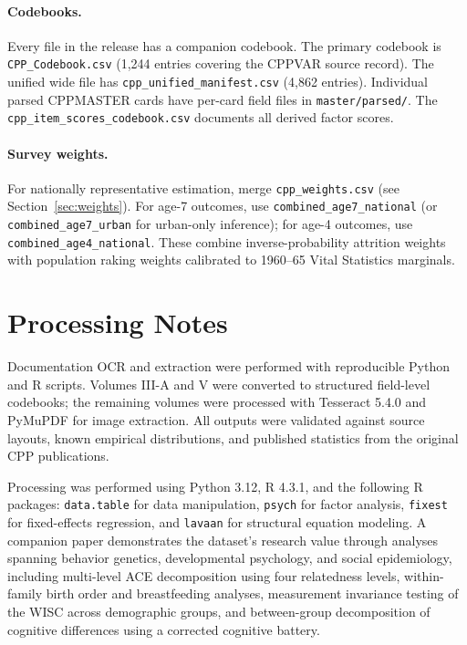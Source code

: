 \documentclass[12pt]{article}
\begin{document}
\paragraph{Codebooks.} Every file in the release has a companion codebook. The primary codebook is \texttt{CPP\_Codebook.csv} (1,244 entries covering the CPPVAR source record). The unified wide file has \texttt{cpp\_unified\_manifest.csv} (4,862 entries). Individual parsed CPPMASTER cards have per-card field files in \texttt{master/parsed/}. The \texttt{cpp\_item\_scores\_codebook.csv} documents all derived factor scores.

\paragraph{Survey weights.} For nationally representative estimation, merge \texttt{cpp\_weights.csv} (see Section~\ref{sec:weights}). For age-7 outcomes, use \texttt{combined\_age7\_national} (or \texttt{combined\_age7\_urban} for urban-only inference); for age-4 outcomes, use \texttt{combined\_age4\_national}. These combine inverse-probability attrition weights with population raking weights calibrated to 1960--65 Vital Statistics marginals.

\section{Processing Notes}

Documentation OCR and extraction were performed with reproducible Python and R scripts. Volumes III-A and V were converted to structured field-level codebooks; the remaining volumes were processed with Tesseract 5.4.0 and PyMuPDF for image extraction. All outputs were validated against source layouts, known empirical distributions, and published statistics from the original CPP publications.

Processing was performed using Python 3.12, R 4.3.1, and the following R packages: \texttt{data.table} for data manipulation, \texttt{psych} for factor analysis, \texttt{fixest} for fixed-effects regression, and \texttt{lavaan} for structural equation modeling. A companion paper demonstrates the dataset's research value through analyses spanning behavior genetics, developmental psychology, and social epidemiology, including multi-level ACE decomposition using four relatedness levels, within-family birth order and breastfeeding analyses, measurement invariance testing of the WISC across demographic groups, and between-group decomposition of cognitive differences using a corrected cognitive battery.
\end{document}
